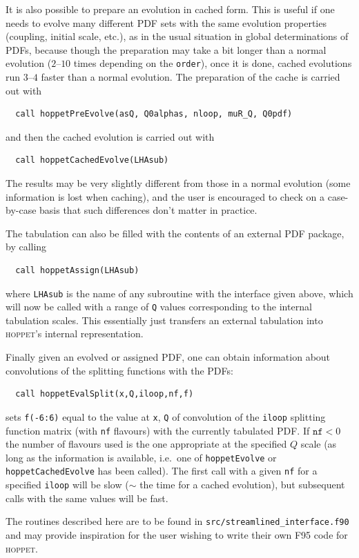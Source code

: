 \documentclass[12pt]{article}
\newcommand{\ie}{i.e.\ }
\newcommand{\hoppet}{\textsc{hoppet}\xspace}
\newcommand{\ttt}[1]{\texttt{#1}}
\begin{document}
It is also possible to prepare an evolution in cached form. This is
useful if one needs to evolve many different PDF sets with the same
evolution properties (coupling, initial scale, etc.), as in the
usual situation in global determinations of PDFs, because though
the preparation may take a bit longer than a normal evolution
($2$--$10$ times depending on the \ttt{order}), once it is done,
cached evolutions run $3$--$4$ faster than a normal evolution. The
preparation of the cache is carried out with
\begin{lstlisting}
  call hoppetPreEvolve(asQ, Q0alphas, nloop, muR_Q, Q0pdf)
\end{lstlisting}
and then the cached evolution is carried out with 
\begin{lstlisting}
  call hoppetCachedEvolve(LHAsub)
\end{lstlisting}
The results may be very slightly different from those in a normal
evolution (some information is lost when caching), and the user is
encouraged to check on a case-by-case basis that such differences
don't matter in practice.

The tabulation can also be filled with the contents of an external PDF
package, by calling
\begin{lstlisting}
  call hoppetAssign(LHAsub)
\end{lstlisting}
where \ttt{LHAsub} is the name of any subroutine with the interface
given above, which will now be called with a range of \ttt{Q} values
corresponding to the internal tabulation scales. This essentially just
transfers an external tabulation into \hoppet's internal
representation. 

Finally given an evolved or assigned PDF, one can obtain information
about convolutions of the splitting functions with the PDFs:
\begin{lstlisting}
  call hoppetEvalSplit(x,Q,iloop,nf,f)
\end{lstlisting}
sets \ttt{f(-6:6)} equal to the value at \ttt{x}, \ttt{Q} of
convolution of the \ttt{iloop} splitting function matrix (with
\ttt{nf} flavours) with the currently tabulated PDF. If $\ttt{nf}<0$
the number of flavours used is the one appropriate at the specified
$Q$ scale (as long as the information is available, \ie one of
\ttt{hoppetEvolve} or \ttt{hoppetCachedEvolve} has been called). The
first call with a given \ttt{nf} for a specified \ttt{iloop} will be
slow ($\sim$ the time for a cached evolution), but subsequent calls
with the same values will be fast.

The routines described here 
are to be 
found in \ttt{src/streamlined\_interface.f90} and may provide inspiration
for the user wishing to write their own F95 code for \hoppet.
\end{document}
